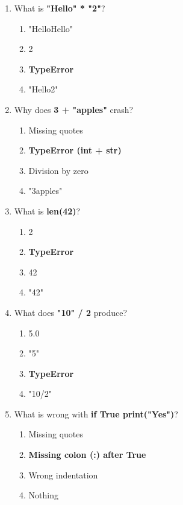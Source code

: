 \documentclass{article}
\begin{document}
\begin{multicols*}{4}
\begin{enumerate}
        \item What is \textbf{"Hello" * "2"}?
        \begin{enumerate}[label=(\Alph*)]
            \item "HelloHello"
            \item 2
            \item \textbf{TypeError}
            \item "Hello2"
        \end{enumerate}

        \item Why does \textbf{3 + "apples"} crash?
        \begin{enumerate}[label=(\Alph*)]
            \item Missing quotes
            \item \textbf{TypeError (int + str)}
            \item Division by zero
            \item "3apples"
        \end{enumerate}

        \item What is \textbf{len(42)}?
        \begin{enumerate}[label=(\Alph*)]
            \item 2
            \item \textbf{TypeError}
            \item 42
            \item "42"
        \end{enumerate}

        \item What does \textbf{"10" / 2} produce?
        \begin{enumerate}[label=(\Alph*)]
            \item 5.0
            \item "5"
            \item \textbf{TypeError}
            \item "10/2"
        \end{enumerate}

        \item What is wrong with \textbf{if True print("Yes")}?
        \begin{enumerate}[label=(\Alph*)]
            \item Missing quotes
            \item \textbf{Missing colon (:) after True}
            \item Wrong indentation
            \item Nothing
        \end{enumerate}


\end{enumerate}
\end{multicols*}
\end{document}
